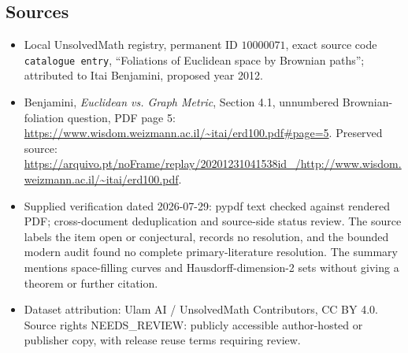 \documentclass[11pt]{article}
\begin{document}
\subsection{Sources}
\begin{itemize}
\item Local UnsolvedMath registry, permanent ID \(10000071\), exact source code \texttt{catalogue entry}, ``Foliations of Euclidean space by Brownian paths''; attributed to Itai Benjamini, proposed year 2012.
\item Benjamini, \emph{Euclidean vs. Graph Metric}, Section 4.1, unnumbered Brownian-foliation question, PDF page 5: \url{https://www.wisdom.weizmann.ac.il/~itai/erd100.pdf#page=5}. Preserved source: \url{https://arquivo.pt/noFrame/replay/20201231041538id_/http://www.wisdom.weizmann.ac.il/~itai/erd100.pdf}.
\item Supplied verification dated 2026-07-29: pypdf text checked against rendered PDF; cross-document deduplication and source-side status review. The source labels the item open or conjectural, records no resolution, and the bounded modern audit found no complete primary-literature resolution. The summary mentions space-filling curves and Hausdorff-dimension-2 sets without giving a theorem or further citation.
\item Dataset attribution: Ulam AI / UnsolvedMath Contributors, CC BY 4.0. Source rights NEEDS\_REVIEW: publicly accessible author-hosted or publisher copy, with release reuse terms requiring review.
\end{itemize}
\end{document}
